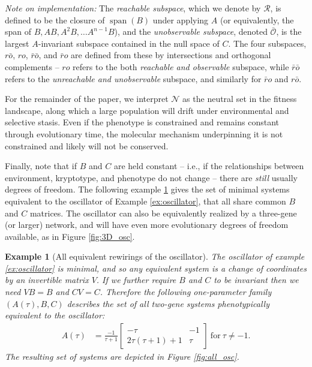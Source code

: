 \documentclass{article}
\newcommand{\ro}{{ro}}
\newcommand{\nro}{{\bar{r}o}}
\newcommand{\rno}{{r\bar{o}}}
\newcommand{\nrno}{{\bar{r}\bar{o}}}
\newcommand{\reachable}{\mathcal{R}}
\newcommand{\unobservable}{\bar{\mathcal{O}}}
\newcommand{\1}{\mathbbm{1}}
\newcommand{\Sys}{\mathcal{S}}
\newcommand{\allS}{\mathcal{N}}
\DeclareMathOperator{\spn}{span}
\newtheorem{example}{Example}
\begin{document}
\emph{Note on implementation:}
The \emph{reachable subspace},
which we denote by $\reachable$,
is defined to be the closure of $\spn(B)$ under applying $A$
(or equivalently, the span of $B, AB, A^2B, \ldots A^{n-1}B$), 
and the \emph{unobservable subspace}, 
denoted $\unobservable$, is the largest $A$-invariant subspace
contained in the null space of $C$.
The four subspaces, $\rno$, $\ro$, $\nrno$, and $\nro$
are defined from these by intersections and orthogonal complements --
$\ro$ refers to the both \emph{reachable and observable} subspace,
while $\nrno$ refers to the \emph{unreachable and unobservable} subspace,
and similarly for $\nro$ and $\rno$.


For the remainder of the paper, we interpret $\allS$ as the neutral set in the fitness landscape, 
along which a large population will drift under environmental and selective stasis. 
Even if the phenotype is constrained and remains constant through evolutionary time, 
the molecular mechanism underpinning it is not constrained and likely will not be conserved.

Finally, note that if $B$ and $C$ are held constant --
i.e., if the relationships between environment, kryptotype, and phenotype do not change --
there are \emph{still} usually degrees of freedom. 
The following example \ref{ex:all_osc} gives the set of minimal systems equivalent to the oscillator of Example \ref{ex:oscillator},
that all share common $B$ and $C$ matrices.
The oscillator can also be equivalently realized by a three-gene (or larger) network, and will have even more evolutionary degrees of freedom available, 
as in Figure \ref{fig:3D_osc}.

\begin{example}[All equivalent rewirings of the oscillator] \label{ex:all_osc}
The oscillator of example \ref{ex:oscillator} is minimal, and so any equivalent system is a change of coordinates
by an invertible matrix $V$.
If we further require $B$ and $C$ to be invariant then we need $VB=B$ and $CV=C$.
Therefore
the following one-parameter family $(A(\tau), B, C)$ describes the set of all two-gene systems
phenotypically equivalent to the oscillator:
    \begin{align*}
      A(\tau) &= \frac{-1}{\tau+1} \begin{bmatrix} -\tau & -1 \\ 2 \tau(\tau + 1) + 1 &  \tau \end{bmatrix} \ \text{for} \ \tau \neq -1 .
    \end{align*}
The resulting set of systems are depicted in Figure \ref{fig:all_osc}.
\end{example}
\end{document}
